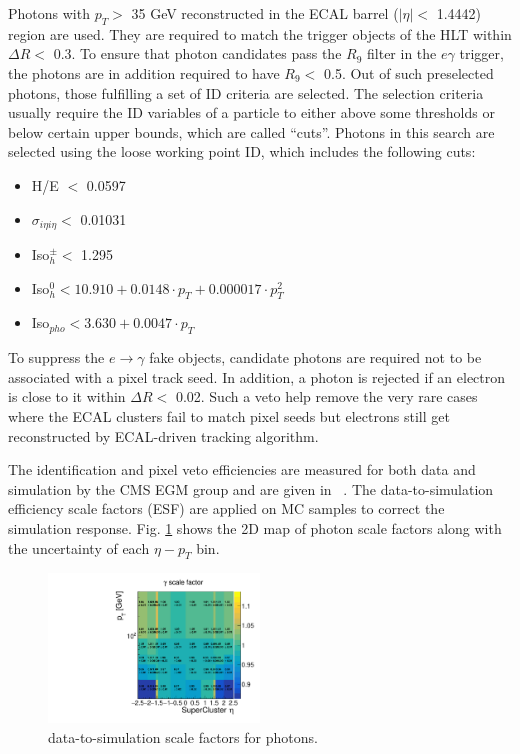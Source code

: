 \documentclass[thesis.tex]{subfiles}
\renewcommand\_{\textunderscore\allowbreak}
\begin{document}
Photons with $p_{T} >$ 35 GeV reconstructed in the ECAL barrel ($|\eta| <$ 1.4442) region are used. 
They are required to match the trigger objects of the HLT within $\Delta R <$ 0.3. 
To ensure that photon candidates pass the $R_9$ filter in the $e\gamma$ trigger, the photons are in addition required to have $R_9 <$ 0.5.
Out of such preselected photons, those fulfilling a set of ID criteria are selected.
The selection criteria usually require the ID variables of a particle to either above some thresholds or below certain upper bounds, which are called ``cuts''. 
Photons in this search are selected using the loose working point ID, which includes the following cuts: 
\begin{center}
\begin{itemize}
\item H/E $<$ 0.0597
\item $\sigma_{i\eta i\eta} <$ 0.01031 
\item Iso$_h^\pm <$ 1.295
\item Iso$_h^0 < 10.910 +0.0148 \cdot p_{T} + 0.000017 \cdot p^2_{T}$
\item Iso$_{pho} < 3.630+0.0047 \cdot p_{T}$
\end{itemize}
\end{center}

To suppress the $e\rightarrow\gamma$ fake objects, candidate photons are required not to be associated with a pixel track seed. 
In addition, a photon is rejected if an electron is close to it within $\Delta R <$ 0.02. 
Such a veto help remove the very rare cases where the ECAL clusters fail to match pixel seeds but electrons still get reconstructed by ECAL-driven tracking algorithm.

The identification and pixel veto efficiencies are measured for both data and simulation by the CMS EGM group and are given in ~\cite{EGM:leptonScale}. The data-to-simulation efficiency scale factors (ESF) are applied on MC samples to correct the simulation response. Fig. \ref{fig:photonsf} shows the 2D map of photon scale factors along with the uncertainty of each $\eta-p_T$ bin.

\begin{figure}[hbtp]
	\centering
	\includegraphics[width=0.5\textwidth]{plot/SF_Photon.pdf}
	\caption{data-to-simulation scale factors for photons.}
	\label{fig:photonsf}
\end{figure}
\end{document}
